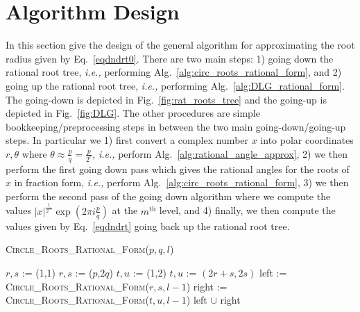 \documentclass[sigconf]{acmart}
\begin{document}
\section{Algorithm Design}\label{sec:alg_des}

In this section give the design of the general algorithm for approximating the root radius given by Eq.~\ref{eqdndrt0}.
There are two main steps: 1) going down the rational root tree, \emph{i.e.,} performing Alg.~\ref{alg:circ_roots_rational_form}, and 2) going up the rational root tree, \emph{i.e.,} performing Alg.~\ref{alg:DLG_rational_form}.
The going-down is depicted in Fig.~\ref{fig:rat_roots_tree} and the going-up is depicted in Fig.~\ref{fig:DLG}.
The other procedures are simple bookkeeping/preprocessing steps in between the two main going-down/going-up steps.
In particular we
1) first convert a complex number $x$ into polar coordinates $r,\theta$ where $\theta \approx \frac{p}{q} = \frac{p}{2^\epsilon}$, \emph{i.e.,} perform Alg.~\ref{alg:rational_angle_approx},
2) we then perform the first going down pass which gives the rational angles for the roots of $x$ in fraction form, \emph{i.e.,} perform Alg.~\ref{alg:circ_roots_rational_form},
3) we then perform the second pass of the going down algorithm where we compute the values $|x|^{\frac{1}{2^m}} \exp(2 \pi i \frac{p}{q})$ at the $m^\mathrm{th}$ level, and
4) finally, we then compute the values given by Eq.~\ref{eqdndrt} going back up the rational root tree.

\begin{algorithm}
   \caption{\textsc{Circle\_Roots\_Rational\_Form}($p,q,l$)}
   \label{alg:circ_roots_rational_form}
\begin{algorithmic}
  \STATE  $r, s$ := (1,1)
\ELSE
  \STATE  $r, s$ := ($p$,$2q$)
\ENDIF
    \STATE $t, u$ := (1,2)
  \ELSE
    \STATE $t, u$ := $(2r+s, 2s)$
  \ENDIF
		  \RETURN [($r,s$),($t,u$)]
		\STATE left  := \textsc{Circle\_Roots\_Rational\_Form}($r,s,l-1$)
		\STATE right := \textsc{Circle\_Roots\_Rational\_Form}($t,u,l-1$)
		\RETURN left $\cup$ right
	\ELSE
		\RETURN  [($p,q$)]
      \ENDIF
\end{algorithmic}
\end{algorithm}
\end{document}
